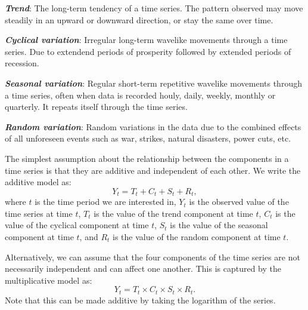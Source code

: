       \vspace{1em}

      \textbf{\textit{Trend}}: The long-term tendency of a time series. The pattern observed may move steadily in an upward or downward direction, or stay the same over time.

      \vspace{1em}

      \textbf{\textit{Cyclical variation}}: Irregular long-term wavelike movements through a time series. Due to extendend periods of prosperity followed by extended periods of recession.

      \vspace{1em}

      \textbf{\textit{Seasonal variation}}: Regular short-term repetitive wavelike movements through a time series, often when data is recorded houly, daily, weekly, monthly or quarterly. It repeats itself through the time series.

      \vspace{1em}

      \textbf{\textit{Random variation}}: Random variations in the data due to the combined effects of all unforeseen events such as war, strikes, natural disasters, power cuts, etc. 

      \vspace{1em}

      The simplest assumption about the relationship between the components in a time series is that they are additive and independent of each other. We write the additive model as: \[Y_{t} = T_{t} + C_{t} + S_{t} + R_{t},\] where \(t\) is the time period we are interested in, \(Y_{t}\) is the observed value of the time series at time \(t\), \(T_{t}\) is the value of the trend component at time \(t\), \(C_{t}\) is the value of the cyclical component at time \(t\), \(S_{t}\) is the value of the seasonal component at time \(t\), and \(R_{t}\) is the value of the random component at time \(t\).

      \vspace{1em}

      Alternatively, we can assume that the four components of the time series are not necessarily independent and can affect one another. This is captured by the multiplicative model as: \[Y_{t} = T_{t} \times C_{t} \times S_{t} \times R_{t}.\] Note that this can be made additive by taking the logarithm of the series.

      \vspace{1em}

